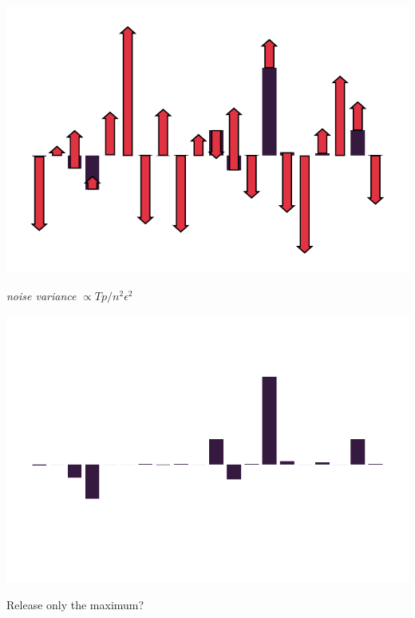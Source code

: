 \documentclass{beamer}
\begin{document}
\begin{frame}
  \vspace{1em}

  \includegraphics[width=\textwidth]{grad_example_2.pdf}

  \vspace{-1.5em}

  \begin{center}
    \Huge \emph{noise variance} $\propto Tp/n^2\epsilon^2$
  \end{center}
  \addtocounter{framenumber}{-1}
\end{frame}

\begin{frame}
  \vspace{1em}

  \includegraphics[width=\textwidth]{grad_example_1.pdf}

  \vspace{-2em}

  \begin{center}
    {\Huge Release only the maximum?}
  \end{center}
\end{frame}
\end{document}
